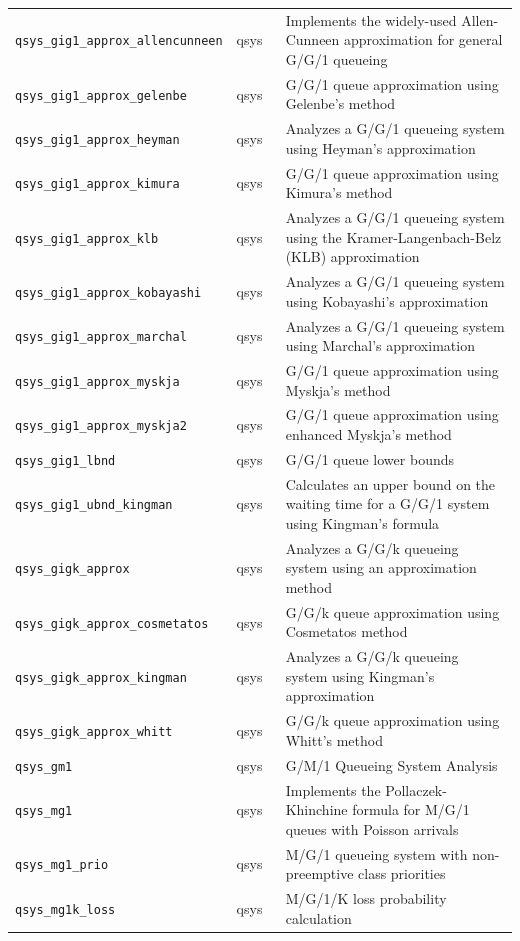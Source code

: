 \begin{footnotesize}
\begin{longtable}{|p{0.4\linewidth}|p{0.1\linewidth}|p{0.5\linewidth}|}
\texttt{qsys\_gig1\_approx\_allencunneen} & qsys & Implements the widely-used Allen-Cunneen approximation for general G/G/1 queueing\\
\texttt{qsys\_gig1\_approx\_gelenbe} & qsys & G/G/1 queue approximation using Gelenbe's method\\
\texttt{qsys\_gig1\_approx\_heyman} & qsys & Analyzes a G/G/1 queueing system using Heyman's approximation\\
\texttt{qsys\_gig1\_approx\_kimura} & qsys & G/G/1 queue approximation using Kimura's method\\
\texttt{qsys\_gig1\_approx\_klb} & qsys & Analyzes a G/G/1 queueing system using the Kramer-Langenbach-Belz (KLB) approximation\\
\texttt{qsys\_gig1\_approx\_kobayashi} & qsys & Analyzes a G/G/1 queueing system using Kobayashi's approximation\\
\texttt{qsys\_gig1\_approx\_marchal} & qsys & Analyzes a G/G/1 queueing system using Marchal's approximation\\
\texttt{qsys\_gig1\_approx\_myskja} & qsys & G/G/1 queue approximation using Myskja's method\\
\texttt{qsys\_gig1\_approx\_myskja2} & qsys & G/G/1 queue approximation using enhanced Myskja's method\\
\texttt{qsys\_gig1\_lbnd} & qsys & G/G/1 queue lower bounds\\
\texttt{qsys\_gig1\_ubnd\_kingman} & qsys & Calculates an upper bound on the waiting time for a G/G/1 system using Kingman's formula\\
\texttt{qsys\_gigk\_approx} & qsys & Analyzes a G/G/k queueing system using an approximation method\\
\texttt{qsys\_gigk\_approx\_cosmetatos} & qsys & G/G/k queue approximation using Cosmetatos method\\
\texttt{qsys\_gigk\_approx\_kingman} & qsys & Analyzes a G/G/k queueing system using Kingman's approximation\\
\texttt{qsys\_gigk\_approx\_whitt} & qsys & G/G/k queue approximation using Whitt's method\\
\texttt{qsys\_gm1} & qsys & G/M/1 Queueing System Analysis\\
\texttt{qsys\_mg1} & qsys & Implements the Pollaczek-Khinchine formula for M/G/1 queues with Poisson arrivals\\
\texttt{qsys\_mg1\_prio} & qsys & M/G/1 queueing system with non-preemptive class priorities\\
\texttt{qsys\_mg1k\_loss} & qsys & M/G/1/K loss probability calculation\\

\end{longtable}
\end{footnotesize}
